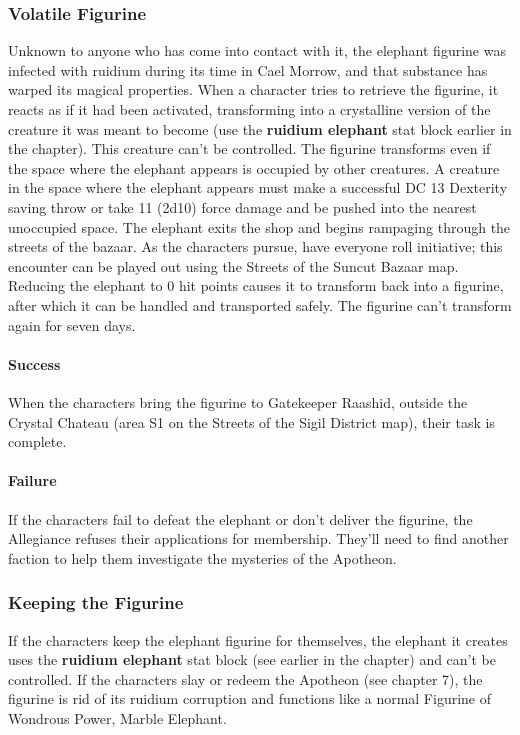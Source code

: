 \documentclass[10pt,a4,twoside,twocolumn,openany,nodeprecatedcode]{dndbook}
\begin{document}
\subsubsection{Volatile Figurine}
Unknown to anyone who has come into contact with it, the elephant figurine was infected with ruidium during its time in Cael Morrow, and that substance has warped its magical properties.
When a character tries to retrieve the figurine, it reacts as if it had been activated, transforming into a crystalline version of the creature it was meant to become (use the \textbf{ruidium elephant} stat block earlier in the chapter). This creature can't be controlled.
The figurine transforms even if the space where the elephant appears is occupied by other creatures. A creature in the space where the elephant appears must make a successful DC 13 Dexterity saving throw or take 11 (2d10) force damage and be pushed into the nearest unoccupied space.
The elephant exits the shop and begins rampaging through the streets of the bazaar. As the characters pursue, have everyone roll initiative; this encounter can be played out using the Streets of the Suncut Bazaar map.
Reducing the elephant to 0 hit points causes it to transform back into a figurine, after which it can be handled and transported safely. The figurine can't transform again for seven days.
\paragraph{Success}
When the characters bring the figurine to Gatekeeper Raashid, outside the Crystal Chateau (area S1 on the Streets of the Sigil District map), their task is complete.
\paragraph{Failure}
If the characters fail to defeat the elephant or don't deliver the figurine, the Allegiance refuses their applications for membership. They'll need to find another faction to help them investigate the mysteries of the Apotheon.
\subsubsection{Keeping the Figurine}
If the characters keep the elephant figurine for themselves, the elephant it creates uses the \textbf{ruidium elephant} stat block (see earlier in the chapter) and can't be controlled.
If the characters slay or redeem the Apotheon (see chapter 7), the figurine is rid of its ruidium corruption and functions like a normal Figurine of Wondrous Power, Marble Elephant.
\end{document}
